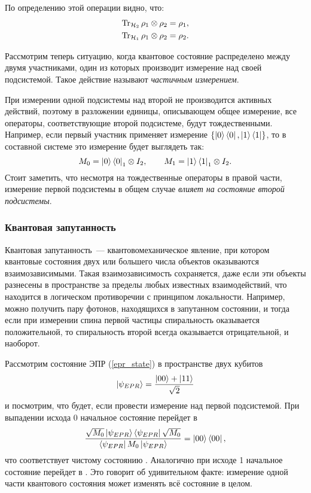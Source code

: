 По определению этой операции видно, что:
\begin{eqnarray}
\operatorname{Tr}_{\mathcal{H}_2} \rho_1 \otimes \rho_2 = \rho_1, \nonumber\\
\operatorname{Tr}_{\mathcal{H}_1} \rho_1 \otimes \rho_2 = \rho_2.
\end{eqnarray}

Рассмотрим теперь ситуацию, когда квантовое состояние распределено между двумя участниками, один из которых производит измерение над своей подсистемой. Такое действие называют \textit{частичным измерением}.

При измерении одной подсистемы над второй не производится активных действий, поэтому в разложении единицы, описывающем общее измерение, все операторы, соответствующие второй подсистеме, будут тождественными. Например, если первый участник применяет измерение $\{\left| 0 \right\rangle\left\langle 0 \right|, \left| 1 \right\rangle\left\langle 1 \right|\}$, то в составной системе это измерение будет выглядеть так:
\begin{equation}M_0 = \left| 0 \right\rangle\left\langle 0 \right|_1 \otimes I_2,\qquad M_1 = \left| 1 \right\rangle\left\langle 1 \right|_1 \otimes I_2.\end{equation}
Стоит заметить, что несмотря на тождественные операторы в правой части, измерение первой подсистемы в общем случае \textit{влияет на состояние второй подсистемы}.

\subsubsection{Квантовая запутанность}
Квантовая запутанность~--- квантовомеханическое явление, при котором квантовые состояния двух или большего числа объектов оказываются взаимозависимыми. Такая взаимозависимость сохраняется, даже если эти объекты разнесены в пространстве за пределы любых известных взаимодействий, что находится в логическом противоречии с принципом локальности. 
Например, можно получить пару фотонов, находящихся в запутанном состоянии, и тогда если при измерении спина первой частицы спиральность оказывается положительной, то спиральность второй всегда оказывается отрицательной, и наоборот.

Рассмотрим состояние ЭПР (\ref{epr_state}) в пространстве двух кубитов
\begin{equation}\left| \psi_{EPR} \right\rangle = \frac{\left| 00 \right\rangle + \left| 11 \right\rangle}{\sqrt{2}}\end{equation}
и посмотрим, что будет, если провести измерение над первой подсистемой. При выпадении исхода 0 начальное состояние перейдет в 
\begin{equation} \frac{\sqrt{M_0}\left| \psi_{EPR} \right\rangle\left\langle \psi_{EPR} \right|\sqrt{M_0}}{ \left\langle \psi_{EPR} \right|M_0\left| \psi_{EPR} \right\rangle} = \left| 00 \right\rangle\left\langle 00 \right|, \end{equation}
что соответствует чистому состоянию . Аналогично при исходе 1 начальное состояние перейдет в . Это говорит об удивительном факте: измерение одной части квантового состояния может изменять всё состояние в целом.

